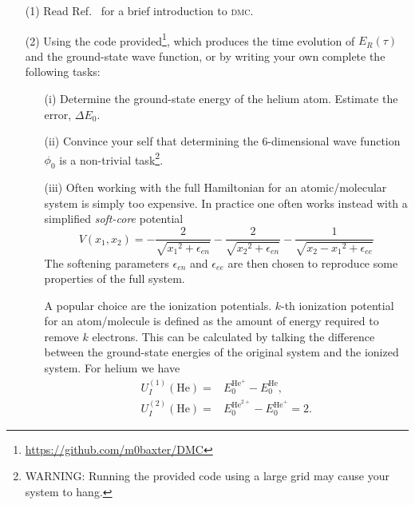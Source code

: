 \documentclass[letterpaper, 11 pt]{article}
\begin{document}
\begin{itemize}

   \item[(1)] Read Ref.~\cite{dmc} for a brief introduction to \textsc{dmc}.

   \item[(2)] Using the code provided\footnote{\href{https://github.com/m0baxter/DMC}
      {https://github.com/m0baxter/DMC}}, which produces the time evolution of $E_R(\tau)$ and the
      ground-state wave function, or by writing your own complete the following tasks:

      \begin{itemize}

         \item[(i)] Determine the ground-state energy of the helium atom. Estimate the error,
            $\Delta E_0$.

         \item[(ii)] Convince your self that determining the 6-dimensional wave function $\phi_0$
            is a non-trivial task\footnote{WARNING: Running the provided code using a large grid
            may cause your system to hang.}.

         \item[(iii)] Often working with the full Hamiltonian for an atomic/molecular system is simply
            too expensive. In practice one often works instead with a simplified \emph{soft-core}
            potential
            \begin{equation}
               V(x_1, x_2) = -\frac{2}{\sqrt{{x_1}^2 + \epsilon_{en}}}
                             -\frac{2}{\sqrt{{x_2}^2 + \epsilon_{en}}}
                             -\frac{1}{\sqrt{{x_2 - x_1}^2 + \epsilon_{ee}}}
            \end{equation}
            The softening parameters $\epsilon_{en}$ and $\epsilon_{ee}$ are then chosen to reproduce
            some properties of the full system.

            A popular choice are the ionization potentials. $k$-th ionization potential for an
            atom/molecule is defined as the amount of energy required to remove $k$ electrons. This can
            be calculated by talking the difference between the ground-state energies of the original
            system and the ionized system. For helium we have
            \begin{align}
               U_I^{(1)}(\mathrm{He}) = & E_0^{\mathrm{He}^+} - E_0^{\mathrm{He}}, \\
               U_I^{(2)}(\mathrm{He}) = & E_0^{\mathrm{He}^{2+}} - E_0^{\mathrm{He}^+} = 2.
            \end{align}


\end{itemize}
\end{itemize}
\end{document}
